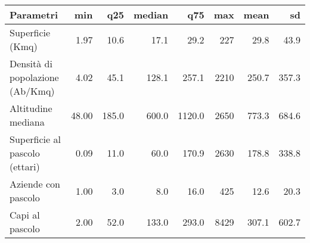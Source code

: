 \documentclass{article}
\begin{document}


\begin{table}[h]
\centering
\caption{}
\begin{tabular}{l|r|r|r|r|r|r|r}
\hline
Parametri & min & q25 & median & q75 & max & mean & sd\\
\hline
Superficie (Kmq) & 1.97 & 10.6 & 17.1 & 29.2 & 227 & 29.8 & 43.9\\
\hline
Densità di popolazione (Ab/Kmq) & 4.02 & 45.1 & 128.1 & 257.1 & 2210 & 250.7 & 357.3\\
\hline
Altitudine mediana & 48.00 & 185.0 & 600.0 & 1120.0 & 2650 & 773.3 & 684.6\\
\hline
Superficie al pascolo (ettari) & 0.09 & 11.0 & 60.0 & 170.9 & 2630 & 178.8 & 338.8\\
\hline
Aziende con pascolo & 1.00 & 3.0 & 8.0 & 16.0 & 425 & 12.6 & 20.3\\
\hline
Capi al pascolo & 2.00 & 52.0 & 133.0 & 293.0 & 8429 & 307.1 & 602.7\\
\hline
\end{tabular}
\end{table}
\end{document}
